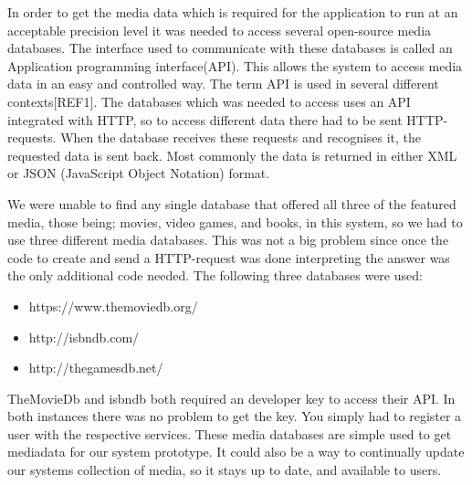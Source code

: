 In order to get the media data which is required for the application to run at an acceptable precision level it was needed to access several open-source media databases. The interface used to communicate with these databases is called an Application programming interface(API). This allows the system to access media data in an easy and controlled way. The term API is used in several different contexts[REF1]. The databases which was  needed to access uses an API integrated with HTTP, so to access different data there had to be sent HTTP-requests. When the database receives these requests and recognises it, the requested data is sent back. Most commonly the data is returned in either XML or JSON (JavaScript Object Notation) format.

We were unable to find any single database that offered all three of the featured media, those being; movies, video games, and books, in this system, so we had to use three different media databases. This was not a big problem since once the code to create and send a HTTP-request was done interpreting the answer was the only additional code needed.  The following three databases were used:

\begin{itemize}
	\item https://www.themoviedb.org/
	\item http://isbndb.com/
	\item http://thegamesdb.net/
\end{itemize}

TheMovieDb and isbndb both required an developer key to access their API. In both instances there was no problem to get the key. You simply had to register a user with the respective services. These media databases are simple used to get mediadata for our system prototype. It could also be a way to continually update our systems collection of media, so it stays up to date, and available to users.
